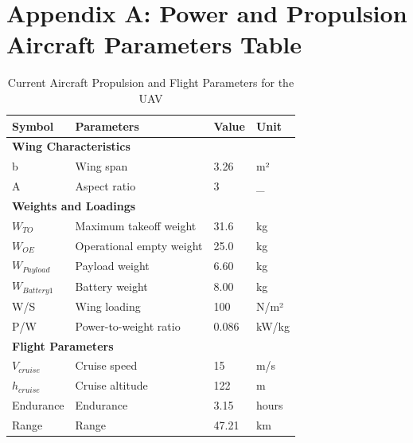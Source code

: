 \documentclass[12pt]{report}
\begin{document}
		\newpage
		
		\section*{Appendix A: Power and Propulsion Aircraft Parameters Table}
		\begin{table}[h!]
			\centering
				\caption{Current Aircraft Propulsion and Flight Parameters for the UAV }
			\begin{tabular}{|l|l|l|l|}
				\hline
				\textbf{Symbol}    & \textbf{Parameters}                  & \textbf{Value}    & \textbf{Unit} \\ \hline
				\multicolumn{4}{|l|}{\textbf{Wing Characteristics}}                                                        \\ \hline
				
				b                 & Wing span                             & 3.26              & m²            \\ \hline
				A                 & Aspect ratio                          & 3                 & \_             \\ \hline
				\multicolumn{4}{|l|}{\textbf{Weights and Loadings}}                                                          \\ \hline
				$W_{TO}$            & Maximum takeoff weight                & 31.6              & kg            \\ \hline
				$W_{OE}$            & Operational empty weight              & 25.0              & kg            \\ \hline
				$W_{Payload}$       & Payload weight                        & 6.60              & kg            \\ \hline
				$W_{Battery1}$      & Battery weight 					       & 8.00              & kg            \\ \hline
				W/S               & Wing loading                          & 100               & N/m²          \\ \hline
				P/W               & Power-to-weight ratio                 & 0.086             & kW/kg         \\ \hline
				\multicolumn{4}{|l|}{\textbf{Flight Parameters}}                                                           \\ \hline
				$V_{cruise}$        & Cruise speed                          & 15         & m/s           \\ \hline
				$h_{cruise}$        & Cruise altitude                       & 122               & m             \\ \hline
				Endurance         & Endurance                             & 3.15              & hours         \\ \hline
				Range             & Range                                 & 47.21             & km            \\ \hline
			\end{tabular}

		\end{table}
\end{document}
